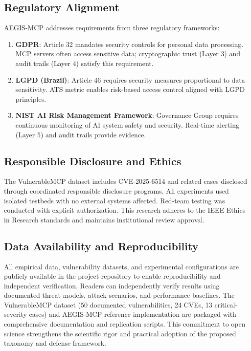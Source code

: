 \documentclass[12pt,twocolumn,journal]{IEEEtran}
\begin{document}
\subsection{Regulatory Alignment}

AEGIS-MCP addresses requirements from three regulatory frameworks:

\begin{enumerate}
\item \textbf{GDPR}: Article 32 \cite{GDPR2018} mandates security controls for personal data processing. MCP servers often access sensitive data; cryptographic trust (Layer 3) and audit trails (Layer 4) satisfy this requirement.

\item \textbf{LGPD (Brazil)}: Article 46 \cite{LGPD2018} requires security measures proportional to data sensitivity. ATS metric enables risk-based access control aligned with LGPD principles.

\item \textbf{NIST AI Risk Management Framework}: Governance Group requires continuous monitoring of AI system safety and security. Real-time alerting (Layer 5) and audit trails provide evidence.
\end{enumerate}

\subsection{Responsible Disclosure and Ethics}

The VulnerableMCP dataset includes CVE-2025-6514 and related cases disclosed through coordinated responsible disclosure programs. All experiments used isolated testbeds with no external systems affected. Red-team testing was conducted with explicit authorization. This research adheres to the IEEE Ethics in Research standards and maintains institutional review approval.

\subsection{Data Availability and Reproducibility}

All empirical data, vulnerability datasets, and experimental configurations are publicly available in the project repository \cite{Costa2026Repo} to enable reproducibility and independent verification. Readers can independently verify results using documented threat models, attack scenarios, and performance baselines. The VulnerableMCP dataset (50 documented vulnerabilities, 24 CVEs, 13 critical-severity cases) and AEGIS-MCP reference implementation are packaged with comprehensive documentation and replication scripts. This commitment to open science strengthens the scientific rigor and practical adoption of the proposed taxonomy and defense framework.
\end{document}
